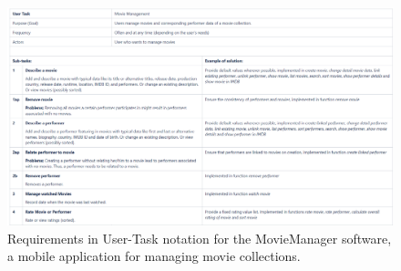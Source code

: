 \newpage
{}
\begin{landscape}

\begin{figure}
	\centering
	\includegraphics[scale=0.57]{../images/MovieManager.png} 
	\caption{Requirements in User-Task notation for the MovieManager software, a mobile application for managing movie collections.}
	\label{fig:mm}
\end{figure}

\end{landscape}
\restoregeometry


